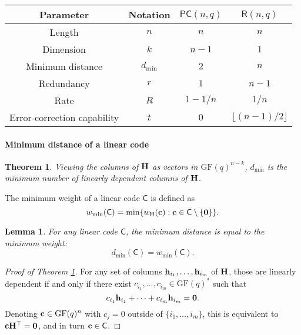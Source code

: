 \documentclass[a4paper, 11pt, openany]{book}
\numberwithin{equation}{section}
\theoremstyle{plain}
\newtheorem{theorem}	[equation]	{Theorem}
\newtheorem{lemma}		[equation]	{Lemma}
\theoremstyle{definition}
\newcommand{\GF}{\mathrm{GF}}
\newcommand{\dmin}{d_{\min}}
\newcommand{\wH}{w_\mathrm{H}}
\newcommand{\wmin}{w_{\min}}
\newcommand{\code}[1]{\mathsf{#1}}
\newcommand{\Paritycheck}           {\code{PC}}
\newcommand{\Repetition}            {\code{R}}
\begin{document}
\begin{tabular}{|c|c|c|c|}
	\hline
	Parameter & Notation & $\Paritycheck(n,q)$ & $\Repetition(n,q)$\\
	\hline
	Length                      & $n$       & $n$       & $n$\\
	Dimension                   & $k$       & $n-1$     & $1$\\
	Minimum distance            & $\dmin$   & $2$       & $n$\\
	Redundancy                  & $r$       & $1$       & $n-1$\\
	Rate                        & $R$       & $1 - 1/n$ & $1/n$\\
	Error-correction capability & $t$       & $0$       & $\lfloor (n-1)/2 \rfloor$\\
	\hline
\end{tabular}



\paragraph{Minimum distance of a linear code}


\begin{theorem} \label{th:dminH}
Viewing the columns of ${\bf H}$ as vectors in $\GF(q)^{n-k}$, $\dmin$ is the minimum number of linearly dependent columns of ${\bf H}$.
\end{theorem}

The minimum weight of a linear code $\code{C}$ is defined as
\[
	\wmin(\code{C}) = \min \{ \wH({\bf c}) : {\bf c} \in \code{C} \setminus \{ {\bf 0} \} \}.
\]

\begin{lemma} \label{lemma:dminwmin}
 For any linear code $\code{C}$, the minimum distance is equal to the minimum weight:
\[
	\dmin(\code{C}) = \wmin(\code{C}).
\]
\end{lemma}

\begin{proof}[Proof of Theorem \ref{th:dminH}]
For any set of columns ${\bf h}_{i_1}, \dots, {\bf h}_{i_m}$ of ${\bf H}$, those are linearly dependent if and only if there exist $c_{i_1}, \dots, c_{i_m} \in \GF(q)^*$ such that 
\[
	c_{i_1} {\bf h}_{i_1} + \dots + c_{i_m} {\bf h}_{i_m} = {\bf 0}.
\]
Denoting ${\bf c} \in \GF(q)^n$ with $c_j = 0$ outside of $\{i_1, \dots, i_m\}$, this is equivalent to ${\bf c}{\bf H}^\top = {\bf 0}$, and in turn ${\bf c} \in \code{C}$.
\end{proof}
\end{document}
